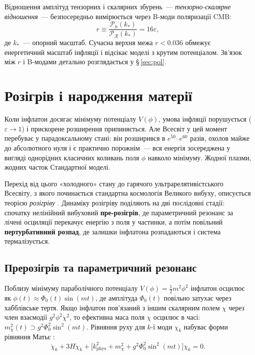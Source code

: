 \documentclass[12pt, a4paper]{article}
\begin{document}
Відношення амплітуд тензорних і скалярних збурень~---
\emph{тензорно-скалярне відношення}~--- безпосередньо
вимірюється через B-моди поляризації CMB:
\begin{equation}\label{eq:tensor_scalar_ratio}
  r \equiv \frac{\mathcal{P}_h(k_*)}
               {\mathcal{P}_{\mathcal{R}}(k_*)}
    = 16\varepsilon,
\end{equation}
де $k_*$~--- опорний масштаб. Сучасна верхня межа
$r < 0.036$ \cite{bicep_keck_2021} обмежує енергетичний
масштаб інфляції і відсікає моделі з крутим потенціалом.
Зв'язок між $r$ і B-модами детально розглядається у
§\,\ref{sec:pol}.

\section{Розігрів і народження матерії}
\label{sec:reheating}

Коли інфлатон досягає мінімуму потенціалу $V(\phi)$, умова
інфляції порушується ($\varepsilon \to 1$) і прискорене
розширення припиняється. Але Всесвіт у цей момент
перебуває у парадоксальному стані: він розширився в
$e^{50}$--$e^{60}$ разів, охолов майже до абсолютного нуля
і є практично порожнім~--- вся енергія зосереджена у
вигляді однорідних класичних коливань поля $\phi$ навколо
мінімуму. Жодної плазми, жодних часток Стандартної моделі.

Перехід від цього «холодного» стану до гарячого
ультрарелятивістського Всесвіту, з якого починається
стандартна космологія Великого вибуху, описується теорією
\emph{розігріву} \cite{linde_1982, albrecht_1982}. Динаміку
розігріву поділяють на дві послідовні стадії: спочатку
нелінійний вибуховий \textbf{пре-розігрів}, де параметричний
резонанс за лічені осциляції перекачує енергію з поля у
частинки, а потім повільний \textbf{пертурбативний розпад},
де залишки інфлатона розпадаються і система термалізується.

\subsection{Прерозігрів та параметричний резонанс}

Поблизу мінімуму параболічного потенціалу
$V(\phi) = \frac{1}{2}m^2\phi^2$ інфлатон осцилює як
$\phi(t) \approx \Phi_0(t)\sin(mt)$, де амплітуда
$\Phi_0(t)$ повільно затухає через хабблівське тертя.
Якщо інфлатон пов'язаний з іншим скалярним полем $\chi$
через член взаємодії $g^2\phi^2\chi^2$, то ефективна маса
поля $\chi$ осцилює в часі: $m_\chi^2(t) \supset
g^2\Phi_0^2\sin^2(mt)$. Рівняння руху для $k$-ї моди
$\chi_k$ набуває форми рівняння Матьє
\cite{kofman_1994, kofman_1997}:
\begin{equation}\label{eq:mathieu}
  \ddot{\chi}_k + 3H\dot{\chi}_k
  + \bigl[k_\mathrm{phys}^2 + m_\chi^2
         + g^2\Phi_0^2\sin^2(mt)\bigr]\chi_k = 0.
\end{equation}
\end{document}
